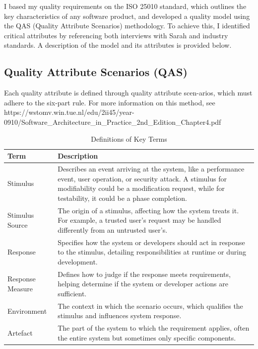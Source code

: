 \documentclass[10pt , a4paper]{report}
\begin{document}
    I based my quality requirements on the ISO 25010 standard, which outlines the key characteristics of any software product, and developed a quality model using the QAS (Quality Attribute Scenarios) methodology. To achieve this, I identified critical attributes by referencing both interviews with Sarah and industry standards. A description of the model and its attributes is provided below.
    
\newpage

\subsection{Quality Attribute Scenarios (QAS)}

Each quality attribute is defined through quality attribute scen-arios, which must adhere to the six-part rule. For more information on this method, see https://wstomv.win.tue.nl/edu/2ii45/year-0910/Software\_Architecture\_in\_Practice\_2nd\_Edition\_Chapter4.pdf

\begin{table}[h!]
    \centering
    \renewcommand{\arraystretch}{1.3} %
    \begin{adjustbox}{max width=\textwidth} %
        \begin{tabular}{| p{3.5cm} | p{10.5cm} |}
            \hline
            \textbf{Term} & \textbf{Description} \\ \hline
            Stimulus & Describes an event arriving at the system, like a performance event, user operation, or security attack. A stimulus for modifiability could be a modification request, while for testability, it could be a phase completion. \\ \hline
            Stimulus Source & The origin of a stimulus, affecting how the system treats it. For example, a trusted user’s request may be handled differently from an untrusted user's. \\ \hline
            Response & Specifies how the system or developers should act in response to the stimulus, detailing responsibilities at runtime or during development. \\ \hline
            Response Measure & Defines how to judge if the response meets requirements, helping determine if the system or developer actions are sufficient. \\ \hline
            Environment & The context in which the scenario occurs, which qualifies the stimulus and influences system response. \\ \hline
            Artefact & The part of the system to which the requirement applies, often the entire system but sometimes only specific components. \\ \hline
        \end{tabular}
    \end{adjustbox}
    \caption{Definitions of Key Terms}
\end{table}
\end{document}
